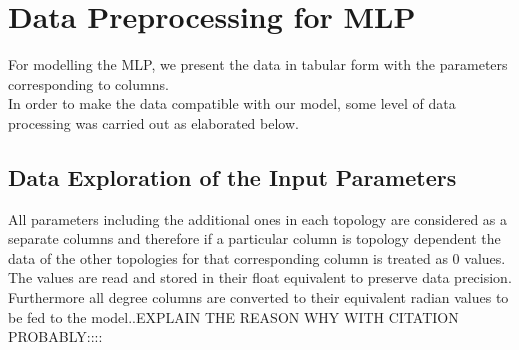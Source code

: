 \documentclass{report} %
\begin{document}
\section{Data Preprocessing for \ac{MLP}}\label{sec:Data Preprocessing for MLP}

For modelling the \ac{MLP}, we present the data in tabular form with the parameters corresponding to columns. \\
In order to make the data compatible with our model, some level of data processing was carried out as elaborated below.

\subsection{Data Exploration of the Input Parameters}\label{sec:Deep Dive into Input Parameters}
All parameters including the additional ones in each topology are considered as a separate columns and therefore if a particular column is topology dependent the data of the other topologies for that corresponding column is treated as 0 values.\\
The values are read and stored in their float equivalent to preserve data precision. Furthermore all degree columns are converted to their equivalent radian values to be fed to the model..EXPLAIN THE REASON WHY WITH CITATION PROBABLY::::\\
\end{document}
